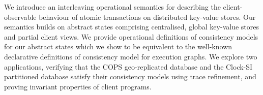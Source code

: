 
We introduce an interleaving operational semantics for describing the
client-observable behaviour of atomic transactions on distributed
key-value stores. Our semantics builds on abstract states comprising
centralised, global key-value stores and partial client views. 
We provide
operational definitions of consistency models for our abstract states  which
we show to be equivalent to the well-known declarative definitions
of consistency model for execution graphs. We explore  two
applications,  verifying  that the COPS 
geo-replicated database
and the  Clock-SI  partitioned database  satisfy their 
consistency
models using trace refinement,  %
and proving  invariant properties of client programs. 
